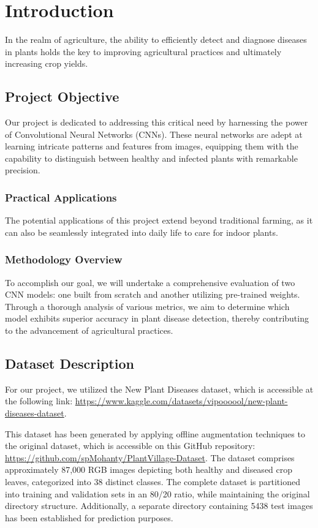 \chapter{Introduction}

In the realm of agriculture, the ability to efficiently detect and diagnose diseases in plants holds the key to 
improving agricultural practices and ultimately increasing crop yields.

\section{Project Objective}

Our project is dedicated to addressing this critical need by harnessing the power of Convolutional Neural 
Networks (CNNs). These neural networks are adept at learning intricate patterns and features from images, 
equipping them with the capability to distinguish between healthy and infected plants with remarkable precision.

\subsection{Practical Applications}

The potential applications of this project extend beyond traditional farming, as it can also be seamlessly 
integrated into daily life to care for indoor plants.

\subsection{Methodology Overview}

To accomplish our goal, we will undertake a comprehensive evaluation of two CNN models: one built from scratch 
and another utilizing pre-trained weights. Through a thorough analysis of various metrics, we aim to determine which 
model exhibits superior accuracy in plant disease detection, thereby contributing to the advancement of agricultural 
practices.

\section{Dataset Description}

For our project, we utilized the New Plant Diseases dataset, which is accessible at the following link: 
\url{https://www.kaggle.com/datasets/vipoooool/new-plant-diseases-dataset}.

This dataset has been generated by applying offline augmentation techniques to the original dataset, 
which is accessible on this GitHub repository: \url{https://github.com/spMohanty/PlantVillage-Dataset}.
The dataset comprises approximately 87,000 RGB images depicting both healthy and diseased crop leaves, 
categorized into 38 distinct classes. The complete dataset is partitioned into training and validation sets in 
an 80/20 ratio, while maintaining the original directory structure. Additionally, a separate directory containing 
5438 test images has been established for prediction purposes.

